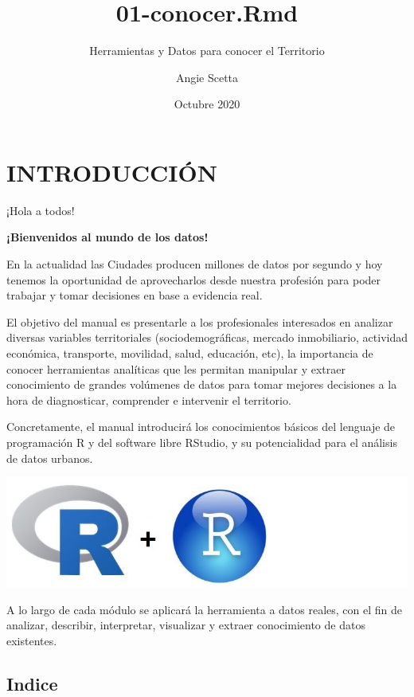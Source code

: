 \documentclass[
  spanish,
]{book}
\title{01-conocer.Rmd}
\subtitle{Herramientas y Datos para conocer el Territorio}
\author{Angie Scetta}
\date{Octubre 2020}
\begin{document}
\maketitle

{
\setcounter{tocdepth}{1}
\tableofcontents
}
\hypertarget{introducciuxf3n}{%
\chapter*{INTRODUCCIÓN}\label{introducciuxf3n}}

¡Hola a todos!

\textbf{¡Bienvenidos al mundo de los datos!}

En la actualidad las Ciudades producen millones de datos por segundo y hoy tenemos la oportunidad de aprovecharlos desde nuestra profesión para poder trabajar y tomar decisiones en base a evidencia real.

El objetivo del manual es presentarle a los profesionales interesados en analizar diversas variables territoriales (sociodemográficas, mercado inmobiliario, actividad económica, transporte, movilidad, salud, educación, etc), la importancia de conocer herramientas analíticas que les permitan manipular y extraer conocimiento de grandes volúmenes de datos para tomar mejores decisiones a la hora de diagnosticar, comprender e intervenir el territorio.

Concretamente, el manual introducirá los conocimientos básicos del lenguaje de programación R y del software libre RStudio, y su potencialidad para el análisis de datos urbanos.

\includegraphics{images/logos.jpg}

A lo largo de cada módulo se aplicará la herramienta a datos reales, con el fin de analizar, describir, interpretar, visualizar y extraer conocimiento de datos existentes.

\hypertarget{indice}{%
\section*{Indice}\label{indice}}
\end{document}
